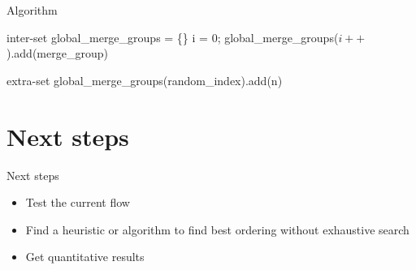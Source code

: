 \documentclass{beamer}
\begin{document}
\begin{frame}[fragile]{Algorithm}
 \small
 \scriptsize
\begin{algorithmic}[1]
    \LineComment inter-set
    \State global\_merge\_groups = \{\}
        \State i = 0;
            \State global\_merge\_groups($i++$).add(merge\_group)
        \EndFor
    \EndFor
    
    \LineComment extra-set
        \State global\_merge\_groups(random\_index).add(n)
    \EndFor
\end{algorithmic}
\end{frame}

\section{Next steps}
\begin{frame}{Next steps}
\begin{itemize}
    \item Test the current flow
    \item Find a heuristic or algorithm to find best ordering without exhaustive search
    \item Get quantitative results
\end{itemize}
\end{frame}
\end{document}
